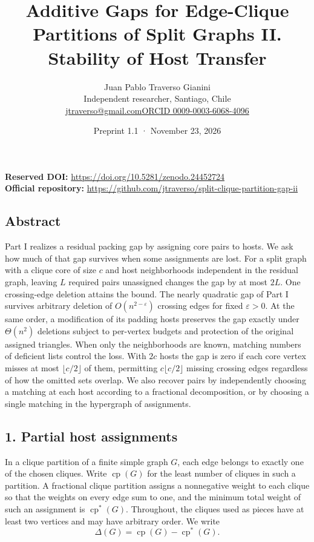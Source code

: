 \documentclass[english,11pt,a4paper]{article}
\title{Additive Gaps for Edge-Clique Partitions of Split Graphs II. Stability of Host Transfer}
\author{Juan Pablo Traverso Gianini\\\small Independent researcher, Santiago, Chile\\\small\href{mailto:jtraverso@gmail.com}{jtraverso@gmail.com}\quad\href{https://orcid.org/0009-0003-6068-4096}{ORCID 0009-0003-6068-4096}}
\date{Preprint 1.1 \enspace · \enspace November 23, 2026}
\begin{document}
\raggedbottom\maketitle
\noindent\textbf{Reserved DOI:} \url{https://doi.org/10.5281/zenodo.24452724}\\
\textbf{Official repository:} \url{https://github.com/jtraverso/split-clique-partition-gap-ii}
\subsection{Abstract}\label{abstract}

Part I realizes a residual packing gap by assigning core pairs to hosts. We ask how much of that gap survives when some assignments are lost. For a split graph with a clique core of size \(c\) and host neighborhoods independent in the residual graph, leaving \(L\) required pairs unassigned changes the gap by at most \(2L\). One crossing-edge deletion attains the bound. The nearly quadratic gap of Part I survives arbitrary deletion of \(O(n^{2-\varepsilon})\) crossing edges for fixed \(\varepsilon>0\). At the same order, a modification of its padding hosts preserves the gap exactly under \(\Theta(n^2)\) deletions subject to per-vertex budgets and protection of the original assigned triangles. When only the neighborhoods are known, matching numbers of deficient lists control the loss. With \(2c\) hosts the gap is zero if each core vertex misses at most \(\lfloor c/2\rfloor\) of them, permitting \(c\lfloor c/2\rfloor\) missing crossing edges regardless of how the omitted sets overlap. We also recover pairs by independently choosing a matching at each host according to a fractional decomposition, or by choosing a single matching in the hypergraph of assignments.

\subsection{1. Partial host assignments}\label{partial-host-assignments}

In a clique partition of a finite simple graph \(G\), each edge belongs to exactly one of the chosen cliques. Write \(\operatorname{cp}(G)\) for the least number of cliques in such a partition. A fractional clique partition assigns a nonnegative weight to each clique so that the weights on every edge sum to one, and the minimum total weight of such an assignment is \(\operatorname{cp}^{\ast}(G)\). Throughout, the cliques used as pieces have at least two vertices and may have arbitrary order. We write
\[
\Delta(G)=\operatorname{cp}(G)-\operatorname{cp}^{\ast}(G).
\]
\end{document}
